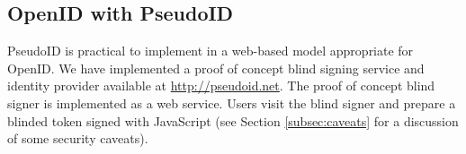 \documentclass{llncs}
\begin{document}

\subsection{OpenID with PseudoID}

PseudoID is practical to implement in a web-based model appropriate
for OpenID. We have implemented a proof of concept blind signing
service and identity provider available at
\url{http://pseudoid.net}. The proof of concept blind signer is
implemented as a web service. Users visit the blind signer and 
prepare a blinded token signed with JavaScript (see Section
\ref{subsec:caveats} for a discussion of some security caveats). 
\end{document}
